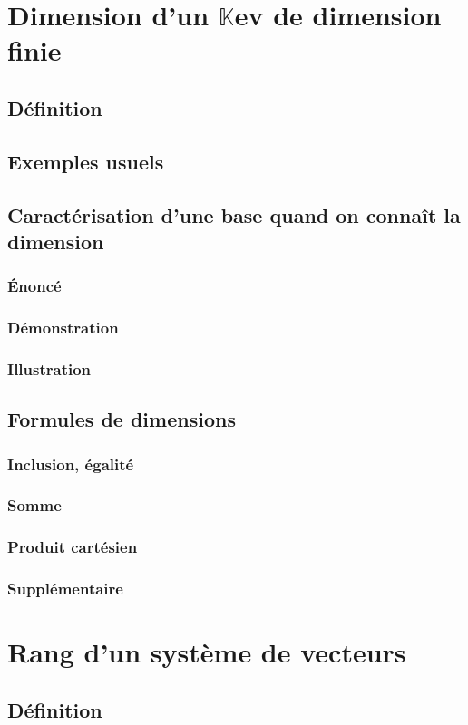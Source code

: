 \documentclass[12pt,a4paper,french]{book}
\begin{document}
	\section{Dimension d'un $\mathbb{K}$ev de dimension finie}
		\subsection{Définition}
		\subsection{Exemples usuels}
		\subsection{Caractérisation d'une base quand on connaît la dimension}
			\subsubsection{Énoncé}
			\subsubsection{Démonstration}
			\subsubsection{Illustration}
		\subsection{Formules de dimensions}
			\subsubsection{Inclusion, égalité}
			\subsubsection{Somme}
			\subsubsection{Produit cartésien}
			\subsubsection{Supplémentaire}
	\section{Rang d'un système de vecteurs}
		\subsection{Définition}
\end{document}
